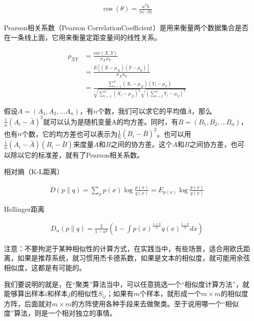 \documentclass[UTF8]{ctexbook}
\begin{document}
\begin{equation}
\begin{aligned}
\cos (\theta)=\frac{a^{T}b}{|a| \cdot |b|}
\end{aligned}
\end{equation}

Pearson相关系数（Pearson CorrelationCoefficient）是用来衡量两个数据集合是否在一条线上面，它用来衡量定距变量间的线性关系。

\begin{equation}
\begin{aligned}
\rho_{XY} &= \frac{cov(X,Y)}{\sigma_{X} \sigma_{Y}} \\
&= \frac{E[(X-\mu_{X})(Y-\mu_{Y})]}{\sigma_{X} \sigma_{Y}}\\
&= \frac{\sum_{i=1}^{n}(X_{i}-\mu_{X})(Y_{i}-\mu_{Y})}{\sqrt{\sum_{i=1}^{n}(X_{i}-\mu_{X})^{2}}\sqrt{(\sum_{i=1}^{n}Y_{i}-\mu_{Y})^{2}}}
\end{aligned}
\end{equation}

假设$A=(A_{1},A_{2},...A_{n})$，有$n$个数，我们可以求它的平均值$\bar{A}$，那么$\frac{1}{n}(A_{i}-\bar{A})^{2}$就可以认为是随机变量A的均方差。同时，有$B=(B_{1},B_{2},...B_{n})$，也有$n$个数，它的均方差也可以表示为$\frac{1} {n}(B_{i}-\bar{B})^{2}$。也可以用$\frac{1} {n}(A_{i}-\bar{A})(B_{i}-\bar{B})$来度量$A$和$B$之间的协方差。这个$A$和$B$之间协方差，也可以除以它的标准差，就有了Pearson相关系数。

相对熵（K-L距离）

\begin{equation}
\begin{aligned}
D(p \parallel q) = \sum_{x}^{ }p(x) \log \frac{p(x)}{q(x)}=E_{p(x)}\log \frac{p(x)}{q(x)}
\end{aligned}
\end{equation}

Hellinger距离

\begin{equation}
\begin{aligned}
D_{\alpha}(p \parallel q) = \frac{2}{1-a^{2}} \left ( 1- \int p(x)^{\frac{1+\alpha}{2}} q(x)^{\frac{1-\alpha}{2}} dx\right )
\end{aligned}
\end{equation}

注意：不要拘泥于某种相似性的计算方式，在实践当中，有些场景，适合用欧氏距离，如果是推荐系统，就习惯用杰卡德系数，如果是文本的相似度，就可能用余弦相似度，这都是有可能的。

我们要说明的就是，在“聚类”算法当中，可以任意挑选一个“相似度计算方法”，就能够算出样本$i$和样本$j$的相似性$S_{ij}$；如果有$m$个样本，就形成一个$m \times m$的相似度方阵，后面就对$m \times m$的方阵使用各种手段来去做聚类。至于说用哪一个“相似度”算法，则是一个相对独立的事情。
\end{document}
